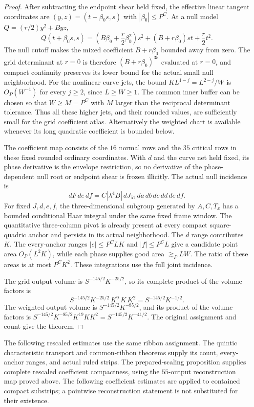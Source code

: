 \documentclass[11pt]{amsart}
\theoremstyle{definition}
\theoremstyle{remark}
\numberwithin{equation}{section}
\begin{document}
\begin{proof}
After subtracting the endpoint shear held fixed, the effective linear tangent coordinates are $(y,z)=(t+\beta_0s,s)$ with $|\beta_0|\le P^C$. At a null model $Q=(r/2)y^2+Byz$,
\[
Q(t+\beta_0s,s)=\left(B\beta_0+\frac r2\beta_0^2\right)s^2+(B+r\beta_0)st+\frac r2t^2.
\]
The null cutoff makes the mixed coefficient $B+r\beta_0$ bounded away from zero. The grid determinant at $r=0$ is therefore $(B+r\beta_0)^{35}$ evaluated at $r=0$, and compact continuity preserves its lower bound for the actual small null neighborhood. For the nonlinear curve jets, the bound $KL^{1-j}=L^{2-j}/W$ is $O_P(W^{-1})$ for every $j\ge2$, since $L\ge W\ge1$. The common inner buffer can be chosen so that $W\ge M=P^C$ with $M$ larger than the reciprocal determinant tolerance. Thus all these higher jets, and their rounded values, are sufficiently small for the grid coefficient atlas. Alternatively the weighted chart is available whenever its long quadratic coefficient is bounded below.

The coefficient map consists of the $16$ normal rows and the $35$ critical rows in these fixed rounded ordinary coordinates. With $d$ and the curve net held fixed, its phase derivative is the envelope restriction, so no derivative of the phase-dependent null root or endpoint shear is frozen illicitly. The actual null incidence is
\[
dF\,de\,df=C|\lambda^4B|\,dJ_{51}\,da\,db\,dc\,dd\,de\,df.
\]
For fixed $J,d,e,f$, the three-dimensional subgroup generated by $A,C,T_x$ has a bounded conditional Haar integral under the same fixed frame window. The quantitative three-column pivot is already present at every compact square-quadric anchor and persists in its actual neighborhood. The $d$ range contributes $K$. The every-anchor ranges $|e|\le P^CLK$ and $|f|\le P^CL$ give a candidate point area $O_P(L^2K)$, while each phase supplies good area $\gtrsim_PLW$. The ratio of these areas is at most $P^CK^2$. These integrations use the full joint incidence.

The grid output volume is $S^{-145/2}K^{-25/2}$, so its complete product of the volume factors is
\[
S^{-145/2}K^{-25/2}\,K^9\,K\,K^2=S^{-145/2}K^{-1/2}.
\]
The weighted output volume is $S^{-145/2}K^{-85/2}$, and its product of the volume factors is $S^{-145/2}K^{-85/2}K^{19}KK^2=S^{-145/2}K^{-41/2}$. The original assignment and count give the theorem.
\end{proof}

The following rescaled estimates use the same ribbon assignment. The quintic characteristic transport and common-ribbon theorems supply its count, every-anchor ranges, and actual ruled strips. The prepared-scaling proposition supplies complete rescaled coefficient compactness, using the $55$-output reconstruction map proved above. The following coefficient estimates are applied to contained compact substrips; a pointwise reconstruction statement is not substituted for their existence.
\end{document}
